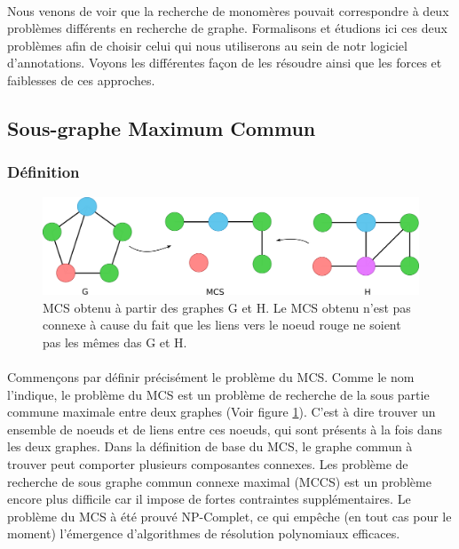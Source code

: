 \documentclass[12pt,french,twoside]{report}
\begin{document}
\paragraph{}Nous venons de voir que la recherche de monomères pouvait correspondre à deux problèmes différents en recherche de graphe.
Formalisons et étudions ici ces deux problèmes afin de choisir celui qui nous utiliserons au sein de notr logiciel d'annotations.
Voyons les différentes façon de les résoudre ainsi que les forces et faiblesses de ces approches.


\subsection{Sous-graphe Maximum Commun}

\subsubsection{Définition}

\begin{figure}[!h]
  \begin{center}
    \includegraphics[width=450px]{Figures/s2m/MCS-SI/mcs.png}
    \caption{\label{mcs_fig}MCS obtenu à partir des graphes G et H.
    Le MCS obtenu n'est pas connexe à cause du fait que les liens vers le noeud rouge ne soient pas les mêmes das G et H.}
  \end{center}
\end{figure}

\paragraph{}Commençons par définir précisément le problème du MCS.
Comme le nom l'indique, le problème du MCS est un problème de recherche de la sous partie commune maximale entre deux graphes (Voir figure \ref{mcs_fig}).
C'est à dire trouver un ensemble de noeuds et de liens entre ces noeuds, qui sont présents à la fois dans les deux graphes.
Dans la définition de base du MCS, le graphe commun à trouver peut comporter plusieurs composantes connexes.
Les problème de recherche de sous graphe commun connexe maximal (MCCS) est un problème encore plus difficile car il impose de fortes contraintes supplémentaires.
Le problème du MCS à été prouvé NP-Complet\cite{garey_computers_1979}, ce qui empêche (en tout cas pour le moment) l'émergence d'algorithmes de résolution polynomiaux efficaces.
\end{document}
